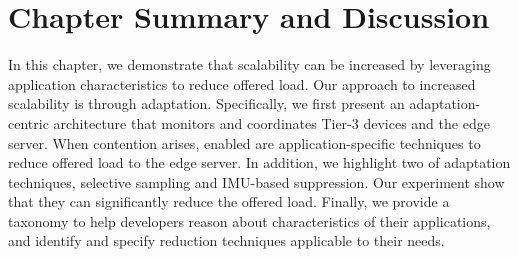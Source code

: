 




\section{Chapter Summary and Discussion}
\label{sec:workload-reduction-summary}

In this chapter, we demonstrate that scalability can be increased by leveraging
application characteristics to reduce offered load. Our approach to increased
scalability is through adaptation. Specifically, we first present an
adaptation-centric architecture that monitors and coordinates Tier-3 devices and
the edge server. When contention arises, enabled are application-specific
techniques to reduce offered load to the edge server. In addition, we highlight
two of adaptation techniques, selective sampling and IMU-based suppression. Our
experiment show that they can significantly reduce the offered load. Finally, we
provide a taxonomy to help developers reason about characteristics of their
applications, and identify and specify reduction techniques applicable to their
needs.
